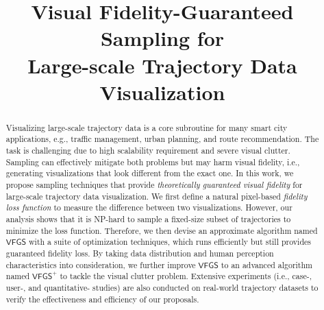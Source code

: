 \documentclass[sigconf, nonacm]{acmart}
\newcommand{\vats}{\mathsf{VFGS}}
\newcommand{\avats}{\mathsf{VFGS}^{+}}
\begin{document}
\title{Visual Fidelity-Guaranteed Sampling for \\ Large-scale Trajectory Data Visualization}



\renewcommand{\shortauthors}{Qiaomu Shen, et al.}
\renewcommand{\shorttitle}{Paper ID: 324}

\begin{abstract}
Visualizing large-scale trajectory data is a core subroutine for many smart city applications, e.g., traffic management, urban planning, and route recommendation. The task is challenging due to high scalability requirement and severe visual clutter. Sampling can effectively mitigate both problems but may harm visual fidelity, i.e., generating visualizations that look different from the exact one. In this work, we propose sampling techniques that provide \textit{theoretically guaranteed visual fidelity} for large-scale trajectory data visualization. We first define a natural pixel-based \textit{fidelity loss function} to measure the difference between two visualizations. However, our analysis shows that it is NP-hard to sample a fixed-size subset of trajectories to minimize the loss function. Therefore, we then devise an approximate algorithm named \textit{$\vats$} with a suite of optimization techniques, which runs efficiently but still provides guaranteed fidelity loss. By taking data distribution and human perception characteristics into consideration, we further improve $\vats$ to an advanced algorithm named $\avats$ to tackle the visual clutter problem. Extensive experiments (i.e., case-, user-, and quantitative- studies) are also conducted on real-world trajectory datasets to verify the effectiveness and efficiency of our proposals.
\end{abstract}
\end{document}
